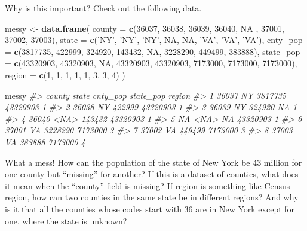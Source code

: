 \documentclass[
]{book}
\newenvironment{Shaded}{\begin{snugshade}}{\end{snugshade}}
\newcommand{\CommentTok}[1]{\textcolor[rgb]{0.56,0.35,0.01}{\textit{#1}}}
\newcommand{\DataTypeTok}[1]{\textcolor[rgb]{0.13,0.29,0.53}{#1}}
\newcommand{\DecValTok}[1]{\textcolor[rgb]{0.00,0.00,0.81}{#1}}
\newcommand{\KeywordTok}[1]{\textcolor[rgb]{0.13,0.29,0.53}{\textbf{#1}}}
\newcommand{\NormalTok}[1]{#1}
\newcommand{\OtherTok}[1]{\textcolor[rgb]{0.56,0.35,0.01}{#1}}
\newcommand{\StringTok}[1]{\textcolor[rgb]{0.31,0.60,0.02}{#1}}
\begin{document}
Why is this important? Check out the following data.

\begin{Shaded}
\begin{Highlighting}[]
\NormalTok{messy <-}\StringTok{ }\KeywordTok{data.frame}\NormalTok{(}
  \DataTypeTok{county =} \KeywordTok{c}\NormalTok{(}\DecValTok{36037}\NormalTok{, }\DecValTok{36038}\NormalTok{, }\DecValTok{36039}\NormalTok{, }\DecValTok{36040}\NormalTok{, }\OtherTok{NA}\NormalTok{ , }\DecValTok{37001}\NormalTok{, }\DecValTok{37002}\NormalTok{, }\DecValTok{37003}\NormalTok{),}
  \DataTypeTok{state =} \KeywordTok{c}\NormalTok{(}\StringTok{'NY'}\NormalTok{, }\StringTok{'NY'}\NormalTok{, }\StringTok{'NY'}\NormalTok{, }\OtherTok{NA}\NormalTok{, }\OtherTok{NA}\NormalTok{, }\StringTok{'VA'}\NormalTok{, }\StringTok{'VA'}\NormalTok{, }\StringTok{'VA'}\NormalTok{),}
  \DataTypeTok{cnty_pop =} \KeywordTok{c}\NormalTok{(}\DecValTok{3817735}\NormalTok{, }\DecValTok{422999}\NormalTok{, }\DecValTok{324920}\NormalTok{, }\DecValTok{143432}\NormalTok{, }\OtherTok{NA}\NormalTok{, }\DecValTok{3228290}\NormalTok{, }\DecValTok{449499}\NormalTok{, }\DecValTok{383888}\NormalTok{),}
  \DataTypeTok{state_pop =} \KeywordTok{c}\NormalTok{(}\DecValTok{43320903}\NormalTok{, }\DecValTok{43320903}\NormalTok{, }\OtherTok{NA}\NormalTok{, }\DecValTok{43320903}\NormalTok{, }\DecValTok{43320903}\NormalTok{, }\DecValTok{7173000}\NormalTok{, }\DecValTok{7173000}\NormalTok{, }\DecValTok{7173000}\NormalTok{),}
  \DataTypeTok{region =} \KeywordTok{c}\NormalTok{(}\DecValTok{1}\NormalTok{, }\DecValTok{1}\NormalTok{, }\DecValTok{1}\NormalTok{, }\DecValTok{1}\NormalTok{, }\DecValTok{1}\NormalTok{, }\DecValTok{3}\NormalTok{, }\DecValTok{3}\NormalTok{, }\DecValTok{4}\NormalTok{)}
\NormalTok{)}

\NormalTok{messy}
\CommentTok{#>   county state cnty_pop state_pop region}
\CommentTok{#> 1  36037    NY  3817735  43320903      1}
\CommentTok{#> 2  36038    NY   422999  43320903      1}
\CommentTok{#> 3  36039    NY   324920        NA      1}
\CommentTok{#> 4  36040  <NA>   143432  43320903      1}
\CommentTok{#> 5     NA  <NA>       NA  43320903      1}
\CommentTok{#> 6  37001    VA  3228290   7173000      3}
\CommentTok{#> 7  37002    VA   449499   7173000      3}
\CommentTok{#> 8  37003    VA   383888   7173000      4}
\end{Highlighting}
\end{Shaded}

What a mess! How can the population of the state of New York be 43 million for one county but ``missing'' for another? If this is a dataset of counties, what does it mean when the ``county'' field is missing? If region is something like Census region, how can two counties in the same state be in different regions? And why is it that all the counties whose codes start with 36 are in New York except for one, where the state is unknown?
\end{document}

